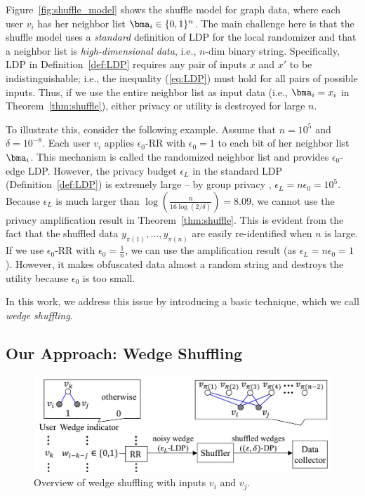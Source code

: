 Figure~\ref{fig:shuffle_model} shows the shuffle model for graph data, where each user $v_i$ has her neighbor list $\bma_i \in \{0,1\}^n$. 
The main challenge here 
is that 
the shuffle model uses a \textit{standard} definition of LDP for the local randomizer and that a neighbor list is \textit{high-dimensional data}, i.e., $n$-dim binary string. 
Specifically, LDP in Definition~\ref{def:LDP} requires any pair of inputs $x$ and $x'$ to be indistinguishable; i.e., 
the inequality (\ref{eq:LDP}) must hold for all pairs of possible inputs. 
Thus, if we use the entire neighbor list 
as input data (i.e., $\bma_i = x_i$ in Theorem~\ref{thm:shuffle}), 
either privacy or utility is destroyed for large $n$. 

To illustrate this, consider the following example. 
Assume that $n=10^5$ and $\delta=10^{-8}$. 
Each user $v_i$ applies 
$\epsilon_0$-RR 
with $\epsilon_0=1$ to each bit of her neighbor list $\bma_i$. 
This mechanism is called the randomized neighbor list \cite{Qin_CCS17} and provides $\epsilon_0$-edge LDP. 
However, the privacy budget $\epsilon_L$ in the standard LDP (Definition~\ref{def:LDP}) 
is extremely large -- by group privacy \cite{DP}, $\epsilon_L = n \epsilon_0 = 10^5$. 
Because 
$\epsilon_L$ 
is much larger than $\log (\frac{n}{16 \log (2/\delta)}) = 8.09$, we cannot use the privacy amplification result in Theorem~\ref{thm:shuffle}. 
This is evident from the fact that the shuffled data $y_{\pi(1)}, \ldots, y_{\pi(n)}$ are easily re-identified when $n$ is large. 
If we use 
$\epsilon_0$-RR 
with $\epsilon_0 = \frac{1}{n}$, we can use the amplification result (as $\epsilon_L = n \epsilon_0 = 1$). 
However, it makes obfuscated data almost a random string and destroys the utility because $\epsilon_0$ is too small. 

In this work, we address this issue by introducing a basic technique, which we call \textit{wedge shuffling}. 

\subsection{Our Approach: Wedge Shuffling}
\label{sub:wedge_shuffle}

\begin{figure}[t]
  \centering
  \includegraphics[width=0.99\linewidth]{fig/wedge_shuffle.pdf}
  \vspace{-2mm}
  \caption{Overview of wedge shuffling with inputs $v_i$ and $v_j$. 
  }
  \label{fig:wedge_shuffle}
\end{figure}


